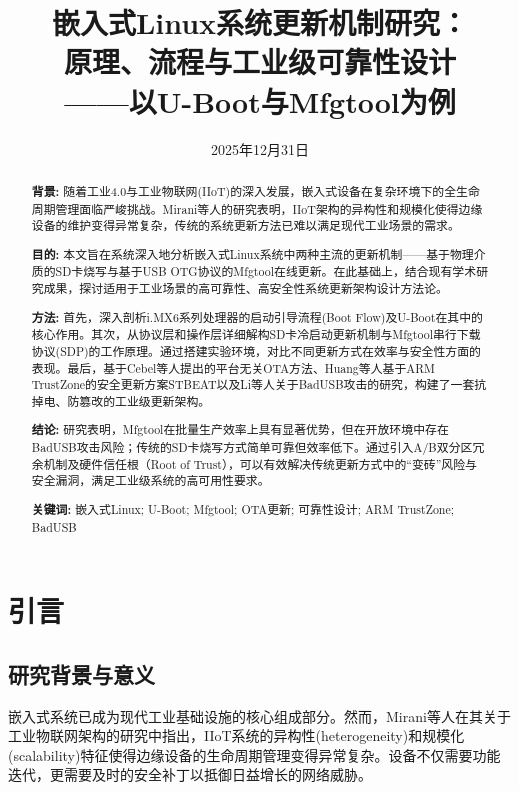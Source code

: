\documentclass[a4paper,12pt]{article}
\title{嵌入式Linux系统更新机制研究：\\原理、流程与工业级可靠性设计\\——以U-Boot与Mfgtool为例}
\date{2025年12月31日}
\makeatletter
\renewcommand{\maketitle}{
  \begin{center}
    \vspace*{2em}
    {\zihao{2}\songti\bfseries \@title \par}
    \vspace{2em}
    {\zihao{-4}\songti \@author \par}
    \vspace{1em}
    {\zihao{-4}\songti \@date \par}
    \vspace{3em}
  \end{center}
}
\makeatother
\begin{document}


\maketitle

\begin{abstract}
\songti
\noindent
\textbf{背景:} 随着工业4.0与工业物联网(IIoT)的深入发展，嵌入式设备在复杂环境下的全生命周期管理面临严峻挑战。Mirani等人的研究表明，IIoT架构的异构性和规模化使得边缘设备的维护变得异常复杂，传统的系统更新方法已难以满足现代工业场景的需求\cite{Mirani2022}。

\textbf{目的:} 本文旨在系统深入地分析嵌入式Linux系统中两种主流的更新机制——基于物理介质的SD卡烧写与基于USB OTG协议的Mfgtool在线更新。在此基础上，结合现有学术研究成果，探讨适用于工业场景的高可靠性、高安全性系统更新架构设计方法论。

\textbf{方法:} 首先，深入剖析i.MX6系列处理器的启动引导流程(Boot Flow)及U-Boot在其中的核心作用。其次，从协议层和操作层详细解构SD卡冷启动更新机制与Mfgtool串行下载协议(SDP)的工作原理。通过搭建实验环境，对比不同更新方式在效率与安全性方面的表现。最后，基于Cebel等人提出的平台无关OTA方法\cite{Cebel2022}、Huang等人基于ARM TrustZone的安全更新方案STBEAT\cite{Huang2022}以及Li等人关于BadUSB攻击的研究\cite{Li2025}，构建了一套抗掉电、防篡改的工业级更新架构。

\textbf{结论:} 研究表明，Mfgtool在批量生产效率上具有显著优势，但在开放环境中存在BadUSB攻击风险；传统的SD卡烧写方式简单可靠但效率低下。通过引入A/B双分区冗余机制及硬件信任根（Root of Trust），可以有效解决传统更新方式中的“变砖”风险与安全漏洞，满足工业级系统的高可用性要求。

\vspace{0.5cm}
\noindent \textbf{关键词:} 嵌入式Linux; U-Boot; Mfgtool; OTA更新; 可靠性设计; ARM TrustZone; BadUSB
\end{abstract}

\newpage
\tableofcontents
\newpage

\section{引言}

\subsection{研究背景与意义}
嵌入式系统已成为现代工业基础设施的核心组成部分。然而，Mirani等人在其关于工业物联网架构的研究中指出，IIoT系统的异构性(heterogeneity)和规模化(scalability)特征使得边缘设备的生命周期管理变得异常复杂\cite{Mirani2022}。设备不仅需要功能迭代，更需要及时的安全补丁以抵御日益增长的网络威胁。
\end{document}
